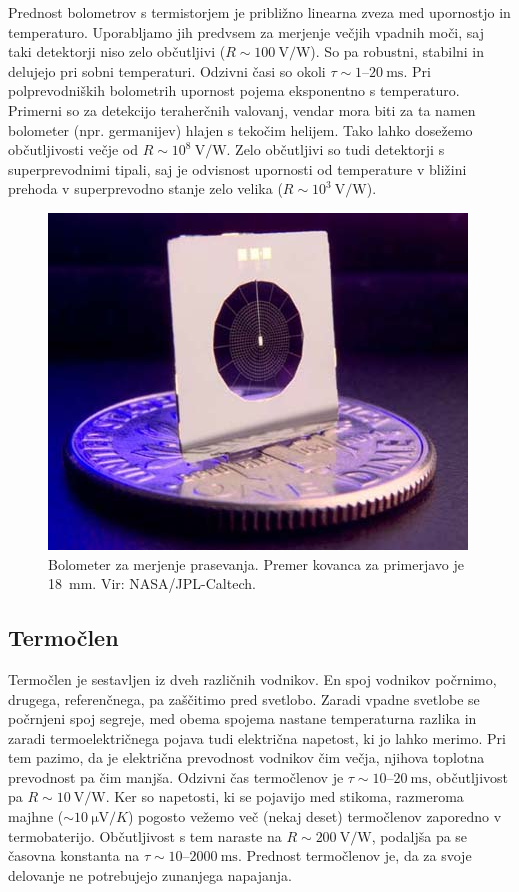 Prednost bolometrov s termistorjem je približno linearna zveza med upornostjo in 
temperaturo. Uporabljamo jih predvsem za merjenje večjih vpadnih moči, saj taki 
detektorji niso zelo občutljivi ($R\sim 100~\si{\volt/\watt}$). 
So pa robustni, stabilni in delujejo pri sobni 
temperaturi. Odzivni časi so okoli $\tau \sim 1$--$20~\si{\milli\second}$. 
Pri polprevodniških bolometrih upornost pojema eksponentno s temperaturo. 
Primerni so za detekcijo teraherčnih valovanj, 
vendar mora biti za ta namen 
bolometer (npr. germanijev) hlajen s tekočim helijem. Tako lahko dosežemo
občutljivosti večje od $R \sim 10^8~\si{\volt/\watt}$. Zelo občutljivi so tudi 
detektorji s superprevodnimi tipali, saj je odvisnost upornosti od temperature v bližini
prehoda v superprevodno stanje zelo velika ($R \sim 10^3~\si{\volt/\watt}$).

\begin{figure}[h]
\centering
\includegraphics[width=75truemm]{slike/11_Bolometer.jpg}
\caption{Bolometer za merjenje prasevanja. Premer kovanca za primerjavo je 18~mm. 
Vir: NASA/JPL-Caltech.}
\label{fig:Bolometer}
\end{figure}

\subsection*{Termočlen}
Termočlen je sestavljen iz dveh različnih vodnikov. 
En spoj vodnikov počrnimo, drugega, 
referenčnega, pa zaščitimo pred svetlobo. Zaradi vpadne svetlobe se počrnjeni spoj 
segreje, med obema spojema nastane temperaturna razlika in zaradi termoelektričnega 
pojava tudi električna napetost, ki jo lahko merimo. Pri tem pazimo, da je električna prevodnost
vodnikov čim večja, njihova toplotna prevodnost pa čim manjša. Odzivni čas termočlenov je 
$\tau \sim 10$--$20~\si{\milli\second}$, občutljivost pa $R \sim 10~\si{\volt/\watt}$.
Ker so napetosti, ki se pojavijo med stikoma, razmeroma majhne 
($\sim 10~\si{\micro\volt/K}$) pogosto vežemo več (nekaj deset) termočlenov zaporedno v
termobaterijo. Občutljivost s tem naraste na $R \sim 200~\si{\volt/\watt}$, podaljša 
pa se časovna konstanta na $\tau \sim 10$--$2000~\si{\milli\second}$. Prednost termočlenov je,
da za svoje delovanje ne potrebujejo zunanjega napajanja. 


